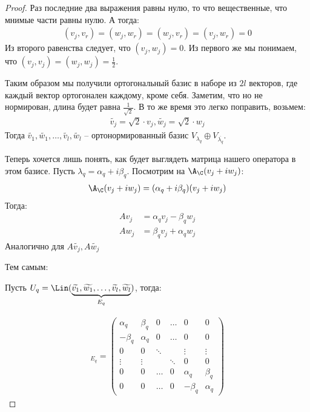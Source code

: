 \begin{theorem}
\begin{proof}
    Раз последние два выражения равны нулю, то что вещественные, что мнимые части равны нулю. А тогда:
    \begin{gather*}
        (v_j, v_r) = (w_j, w_r) = (w_j, v_r) = (v_j, w_r) = 0
    \end{gather*}
    Из второго равенства следует, что $(v_j, w_j) = 0$.
    Из первого же мы понимаем, что $(v_j, v_j) = (w_j, w_j) = \frac{1}{2}$.

    Таким образом мы получили ортогональный базис в наборе из $2l$ векторов, где каждый вектор ортогонален каждому, кроме себя. Заметим, что но не нормирован, длина будет равна $\frac{1}{\sqrt{2}}$. В то же время это легко поправить, возьмем:
    \begin{gather*}
        \widetilde{v_j} = \sqrt{2} \cdot v_j, \widetilde{w_j} = \sqrt{2} \cdot w_j
    \end{gather*}
    Тогда $\widetilde{v_1}, \widetilde{w_1}, \dots, \widetilde{v_l}, \widetilde{w_l}$ -- ортонормированный базис $V_{\lambda_q} \oplus V_{\overline{\lambda_{q}}}$.

    Теперь хочется лишь понять, как будет выглядеть матрица нашего оператора в этом базисе. 
    Пусть $\lambda_q = \alpha_q + i \beta_q$. 
    Посмотрим на $\A_{\C}(v_j + iw_j)$:
    \begin{gather*}
        \A_{\C}(v_j + iw_j) = (\alpha_q + i \beta_q) (v_j + iw_j)
    \end{gather*}
    Тогда:
    \begin{align*}
        Av_j &= \alpha_q v_j -  \beta_q w_j \\
        Aw_j &= \beta_q v_j + \alpha_q w_j
    \end{align*}
    Аналогично для $A\widetilde{v_{j}}, A\widetilde{w_{j}}$

    Тем самым: 

    Пусть $U_q = \Lin (\underbrace{\widetilde{v_1}, \widetilde{w_1}, \dots, \widetilde{v_l}, \widetilde{w_l}}_{\text{$ E_q $}} )$, тогда:
    
    \begin{gather*}
        [\A |_{U_q}]_{E_q} = \left(\begin{array}{cccccc}
        \alpha_q & \beta_q  & 0       & \dots    & 0        & 0\\ 
        -\beta_q & \alpha_q & 0       & \dots    & 0        & 0\\ 
        0        & 0        & \ddots  &          & \vdots   & \vdots \\ 
        \vdots   & \vdots   &         & \ddots   & 0        & 0 \\
        0        & 0        &  \dots  & 0        & \alpha_q & \beta_q \\ 
        0        & 0        & \dots   & 0        & -\beta_q & \alpha_q
        \end{array}\right)
    \end{gather*}   
\end{proof} 
\end{theorem}